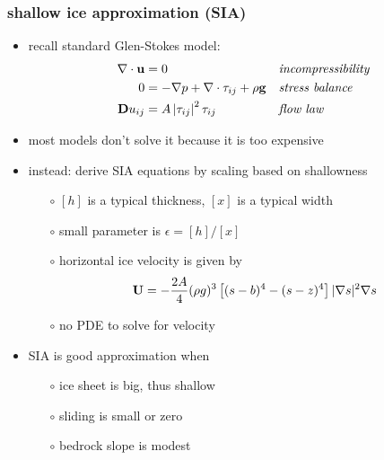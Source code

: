 \documentclass[10pt,hyperref={pdfpagelabels=true}]{beamer}
\newcommand{\eps}{\epsilon}
\begin{document}
\begin{frame}
  \frametitle{shallow ice approximation (SIA)}

\begin{itemize}
\item recall standard Glen-Stokes model:
\small
\begin{align*}
\nabla \cdot \mathbf{u} &= 0 &&\text{\emph{incompressibility}} \\
0 &= - \nabla p + \nabla \cdot \tau_{ij} + \rho \mathbf{g} &&\text{\emph{stress balance}} \\
\mathbf{D}u_{ij} &= A \left|\tau_{ij}\right|^2 \tau_{ij} &&\text{\emph{flow law}}
\end{align*}
\normalsize
\item \alert{most models don't solve it because it is too expensive}
\item instead: derive SIA equations by scaling based on shallowness
  \begin{itemize}
  \item[$\circ$] $[h]$ is a typical thickness, $[x]$ is a typical width
  \item[$\circ$] small parameter is $\eps = [h] / [x]$
  \item[$\circ$] horizontal ice velocity is given by 
  $${\bf U}  =  - \frac{2 A}{4} (\rho g)^{3} \left[ (s-b)^4 - (s - z)^4  \right] 
|\nabla s |^{2} \nabla s$$
  \item[$\circ$] no PDE to solve for velocity
  \end{itemize}
\item SIA is good approximation when
  \begin{itemize}
  \item[$\circ$] ice sheet is big, thus shallow
  \item[$\circ$] sliding is small or zero
  \item[$\circ$] bedrock slope is modest
  \end{itemize}
\end{itemize}
\end{frame}
\end{document}
